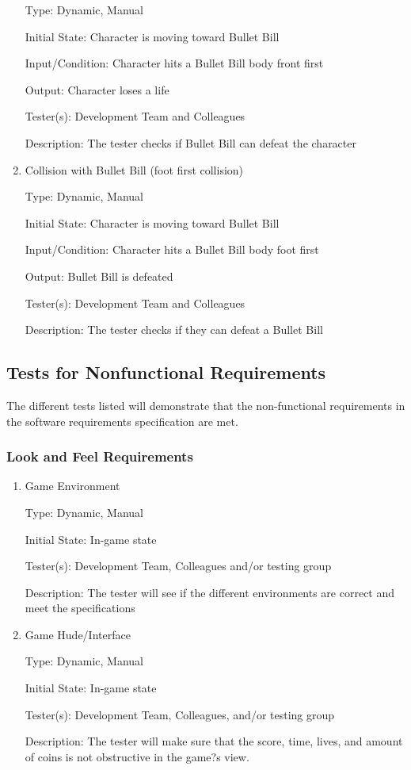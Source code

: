 \documentclass[12pt, titlepage]{article}
\begin{document}
\begin{enumerate}
Type: Dynamic, Manual

Initial State: Character is moving toward Bullet Bill

Input/Condition: Character hits a Bullet Bill body front first

Output: Character loses a life

Tester(s): Development Team and Colleagues

Description: The tester checks if Bullet Bill can defeat the character



\item{Collision with Bullet Bill (foot first collision)\\}

Type: Dynamic, Manual

Initial State: Character is moving toward Bullet Bill

Input/Condition: Character hits a Bullet Bill body foot first

Output: Bullet Bill is defeated

Tester(s): Development Team and Colleagues

Description: The tester checks if they can defeat a Bullet Bill

\end{enumerate}

\subsection{Tests for Nonfunctional Requirements}
The different tests listed will demonstrate that the non-functional requirements in the software requirements specification are met.

\subsubsection{Look and Feel Requirements}

\begin{enumerate}

\item{Game Environment\\}

Type: Dynamic, Manual

Initial State: In-game state

Tester(s): Development Team, Colleagues and/or testing group

Description: The tester will see if the different environments are correct and meet the specifications
					
\item{Game Hude/Interface\\}

Type: Dynamic, Manual

Initial State: In-game state

Tester(s): Development Team, Colleagues, and/or testing group

Description: The tester will make sure that the score, time, lives, and amount of coins is not obstructive in the game?s view.

\end{enumerate}
\end{document}
